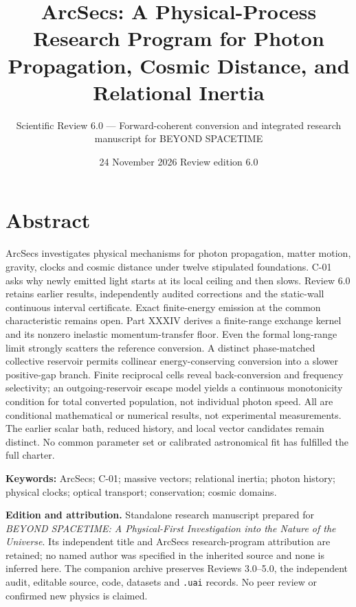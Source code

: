 \documentclass[
  11pt,
  twoside]{article}
\title{ArcSecs: A Physical-Process Research Program for Photon
Propagation, Cosmic Distance, and Relational Inertia}
\subtitle{Scientific Review 6.0 --- Forward-coherent conversion and
integrated research manuscript for BEYOND SPACETIME}
\author{}
\date{24 November 2026 \textbar{} Review edition 6.0}
\begin{document}
\maketitle

{
\setcounter{tocdepth}{2}
\tableofcontents
}
\newpage

\section{Abstract}\label{abstract}

ArcSecs investigates physical mechanisms for photon propagation, matter
motion, gravity, clocks and cosmic distance under twelve stipulated
foundations. C-01 asks why newly emitted light starts at its local
ceiling and then slows. Review 6.0 retains earlier results,
independently audited corrections and the static-wall continuous
interval certificate. Exact finite-energy emission at the common
characteristic remains open. Part XXXIV derives a finite-range exchange
kernel and its nonzero inelastic momentum-transfer floor. Even the
formal long-range limit strongly scatters the reference conversion. A
distinct phase-matched collective reservoir permits collinear
energy-conserving conversion into a slower positive-gap branch. Finite
reciprocal cells reveal back-conversion and frequency selectivity; an
outgoing-reservoir escape model yields a continuous monotonicity
condition for total converted population, not individual photon speed.
All are conditional mathematical or numerical results, not experimental
measurements. The earlier scalar bath, reduced history, and local vector
candidates remain distinct. No common parameter set or calibrated
astronomical fit has fulfilled the full charter.

\textbf{Keywords:} ArcSecs; C-01; massive vectors; relational inertia;
photon history; physical clocks; optical transport; conservation; cosmic
domains.

\textbf{Edition and attribution.} Standalone research manuscript
prepared for \emph{BEYOND SPACETIME: A Physical-First Investigation into
the Nature of the Universe}. Its independent title and ArcSecs
research-program attribution are retained; no named author was specified
in the inherited source and none is inferred here. The companion archive
preserves Reviews 3.0--5.0, the independent audit, editable source,
code, datasets and \texttt{.uai} records. No peer review or confirmed
new physics is claimed.

\newpage
\end{document}
